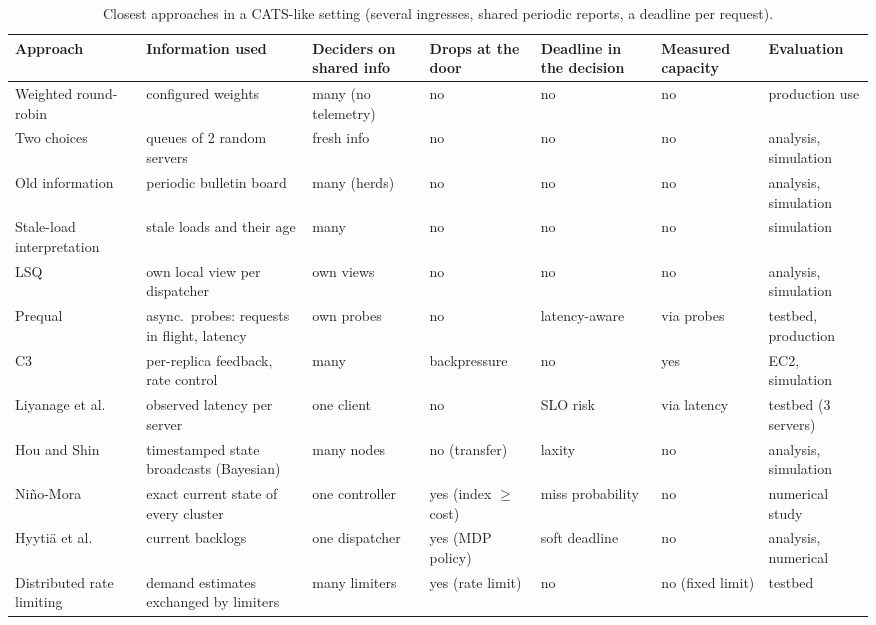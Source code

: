\documentclass[conference]{IEEEtran}
\begin{document}
\begin{table}[t]
\centering
\caption{Closest approaches in a CATS-like setting (several ingresses, shared periodic reports, a deadline per request).}
\label{tab:matrix}
\scriptsize
\setlength{\tabcolsep}{3pt}
\begin{tabular}{@{}>{\raggedright\arraybackslash}p{2.7cm}>{\raggedright\arraybackslash}p{4.3cm}>{\raggedright\arraybackslash}p{2.1cm}>{\raggedright\arraybackslash}p{1.9cm}>{\raggedright\arraybackslash}p{1.8cm}>{\raggedright\arraybackslash}p{1.5cm}>{\raggedright\arraybackslash}p{2.3cm}@{}}
\toprule
Approach & Information used & Deciders on shared info & Drops at the door & Deadline in the decision & Measured capacity & Evaluation\\
\midrule
Weighted round-robin~\cite{swrr} & configured weights & many (no telemetry) & no & no & no & production use\\
Two choices~\cite{mitz2001two} & queues of 2 random servers & fresh info & no & no & no & analysis, simulation\\
Old information~\cite{mitz2000old} & periodic bulletin board & many (herds) & no & no & no & analysis, simulation\\
Stale-load interpretation~\cite{dahlin} & stale loads and their age & many & no & no & no & simulation\\
LSQ~\cite{lsq} & own local view per dispatcher & own views & no & no & no & analysis, simulation\\
Prequal~\cite{prequal} & async.\ probes: requests in flight, latency & own probes & no & latency-aware & via probes & testbed, production\\
C3~\cite{c3} & per-replica feedback, rate control & many & backpressure & no & yes & EC2, simulation\\
Liyanage et al.~\cite{liyanage} & observed latency per server & one client & no & SLO risk & via latency & testbed (3 servers)\\
Hou and Shin~\cite{houshin} & timestamped state broadcasts (Bayesian) & many nodes & no (transfer) & laxity & no & analysis, simulation\\
Niño-Mora~\cite{ninomora} & exact current state of every cluster & one controller & yes (index $\ge$ cost) & miss probability & no & numerical study\\
Hyytiä et al.~\cite{hyytia} & current backlogs & one dispatcher & yes (MDP policy) & soft deadline & no & analysis, numerical\\
Distributed rate limiting~\cite{drl} & demand estimates exchanged by limiters & many limiters & yes (rate limit) & no & no (fixed limit) & testbed\\

\end{tabular}
\end{table}
\end{document}
